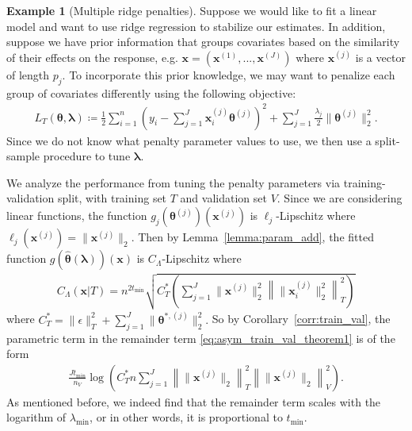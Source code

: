 \documentclass[12pt]{article} %
\theoremstyle{definition}
\newtheorem{example}{Example}
\begin{document}
\begin{example}[Multiple ridge penalties]
	Suppose we would like to fit a linear model and want to use ridge regression to stabilize our estimates.
	In addition, suppose we have prior information that groups covariates based on the similarity of their effects on the response, e.g. $\boldsymbol{x} = (\boldsymbol{x}^{(1)}, ... , \boldsymbol{x}^{(J)})$ where $\boldsymbol{x}^{(j)}$ is a vector of length $p_j$.
	To incorporate this prior knowledge, we may want to penalize each group of covariates differently using the following objective:
	\begin{align}
	L_T \left (\boldsymbol{\theta}, \boldsymbol{\lambda} \right) 
	\coloneqq 
	\frac{1}{2}
	\sum_{i=1}^n
	\left(y_i -  \sum_{j=1}^J \boldsymbol{x}_{i}^{(j)} \boldsymbol{\theta}^{(j)} \right )^2
	+ \sum_{j=1}^J \frac{\lambda_j}{2} \|\boldsymbol{\theta}^{(j)}\|_2^2.
	\end{align}
	Since we do not know what penalty parameter values to use, we then use a split-sample procedure to tune $\boldsymbol{\lambda}$.

	We analyze the performance from tuning the penalty parameters via training-validation split, with training set $T$ and validation set $V$.
	Since we are considering linear functions, the function $g_j(\boldsymbol{\theta}^{(j)})(\boldsymbol{x}^{(j)})$ is $\ell_j$-Lipschitz where $\ell_j(\boldsymbol{x}^{(j)}) = \|\boldsymbol{x}^{(j)}\|_2$.
	Then by Lemma~\ref{lemma:param_add}, the fitted function $g(\hat{\boldsymbol{\theta}}(\boldsymbol{\lambda}))(\boldsymbol{x})$ is $C_\Lambda$-Lipschitz where
	\begin{align}
	C_\Lambda \left ( \boldsymbol{x} | T \right ) =
	n^{2t_{\min}}
	\sqrt{
		C^*_{T}
		\left(
		\sum_{j = 1}^J
		\|\boldsymbol{x}^{(j)}\|_2^2
		\left \| \|\boldsymbol{x}^{(j)}_i \|_2^2 \right \|_T^2
		\right)
	}
	\end{align}
	where $
	C^*_{T} = 
	\|\epsilon\|_{T}^{2}
	+ \sum_{j=1}^J \|\boldsymbol{\theta}^{*,(j)}\|_2^2
	.$
	So by Corollary~\ref{corr:train_val}, the parametric term in the remainder term \eqref{eq:asym_train_val_theorem1} is of the form
	\begin{align}
	\frac{J t_{\min}}{n_{V}}
	\log \left (
	C^*_T n
	\sum_{j = 1}^J \left \|\|\boldsymbol{x}^{(j)} \|_2 \right \|_T^2 \left \|\|\boldsymbol{x}^{(j)}\|_2 \right \|_V^2
	\right ).
	\end{align}
	As mentioned before, we indeed find that the remainder term scales with the logarithm of $\lambda_{\min}$, or in other words, it is proportional to $t_{\min}$.
\end{example}
\end{document}
